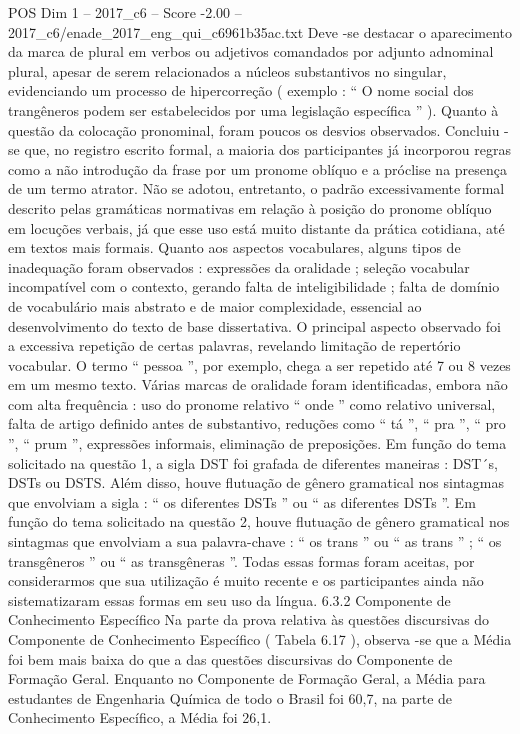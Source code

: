 \begin{textsample}{POS Dim 1 – 2017\_c6 – Score -2.00 – 2017\_c6/enade\_2017\_eng\_qui\_c6961b35ac.txt}
Deve -se destacar o aparecimento da marca de plural em verbos ou adjetivos comandados por adjunto adnominal plural, apesar de serem relacionados a núcleos substantivos no singular, evidenciando um processo de hipercorreção ( exemplo : “ O nome social dos trangêneros podem ser estabelecidos por uma legislação específica ” ).
Quanto à questão da colocação pronominal, foram poucos os desvios observados.
Concluiu -se que, no registro escrito formal, a maioria dos participantes já incorporou regras como a não introdução da frase por um pronome oblíquo e a próclise na presença de um termo atrator.
Não se adotou, entretanto, o padrão excessivamente formal descrito pelas gramáticas normativas em relação à posição do pronome oblíquo em locuções verbais, já que esse uso está muito distante da prática cotidiana, até em textos mais formais.
Quanto aos aspectos vocabulares, alguns tipos de inadequação foram observados : expressões da oralidade ; seleção vocabular incompatível com o contexto, gerando falta de inteligibilidade ; falta de domínio de vocabulário mais abstrato e de maior complexidade, essencial ao desenvolvimento do texto de base dissertativa.
O principal aspecto observado foi a excessiva repetição de certas palavras, revelando limitação de repertório vocabular.
O termo “ pessoa ”, por exemplo, chega a ser repetido até 7 ou 8 vezes em um mesmo texto.
Várias marcas de oralidade foram identificadas, embora não com alta frequência : uso do pronome relativo “ onde ” como relativo universal, falta de artigo definido antes de substantivo, reduções como “ tá ”, “ pra ”, “ pro ”, “ prum ”, expressões informais, eliminação de preposições.
Em função do tema solicitado na questão 1, a sigla DST foi grafada de diferentes maneiras : DST´s, DSTs ou DSTS.
Além disso, houve flutuação de gênero gramatical nos sintagmas que envolviam a sigla : “ os diferentes DSTs ” ou “ as diferentes DSTs ”.
Em função do tema solicitado na questão 2, houve flutuação de gênero gramatical nos sintagmas que envolviam a sua palavra-chave : “ os trans ” ou “ as trans ” ; “ os transgêneros ” ou “ as transgêneras ”.
Todas essas formas foram aceitas, por considerarmos que sua utilização é muito recente e os participantes ainda não sistematizaram essas formas em seu uso da língua. 6.3.2 Componente de Conhecimento Específico Na parte da prova relativa às questões discursivas do Componente de Conhecimento Específico ( Tabela 6.17 ), observa -se que a Média foi bem mais baixa do que a das questões discursivas do Componente de Formação Geral.
Enquanto no Componente de Formação Geral, a Média para estudantes de Engenharia Química de todo o Brasil foi 60,7, na parte de Conhecimento Específico, a Média foi 26,1.

\end{textsample}
